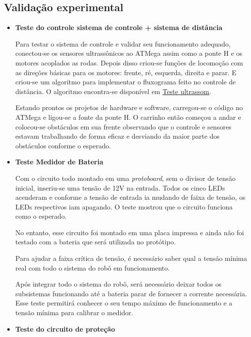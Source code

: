 \subsection{Validação experimental} %
	\label{sub:validação_experimental}
	\begin{itemize}
		\item \textbf{Teste do controle sistema de controle + sistema de distância}

			Para testar o sistema de controle e validar seu funcionamento adequado, conectou-se os sensores ultrassônicos ao ATMega assim como a ponte H e os motores acoplados as rodas. Depois disso criou-se funções de locomoção com as direções básicas para os motores: frente, ré, esquerda, direita e parar. E criou-se um algoritmo para implementar o fluxograma feito no controle de distância. O algoritmo encontra-se disponível em \href{https://github.com/kaiocoelho/CodigoESP/blob/master/codigo_teste/Teste_ultrassom.ino}{Teste ultrassom}.

			Estando prontos os projetos de hardware e software, carregou-se o código no ATMega e ligou-se a fonte da ponte H. O carrinho então começou a andar e colocou-se obstáculos em sua frente observando que o controle e sensores estavam trabalhando de forma eficaz e desviando da maior parte dos obstáculos conforme o esperado.

		\item \textbf{Teste Medidor de Bateria}

			Com o circuito todo montado em uma \textit{protoboard}, sem o divisor de tensão inicial, inseriu-se uma tensão de 12V na entrada. Todos os cinco LEDs acenderam e conforme a tensão de entrada ia mudando de faixa de tensão, os LEDs respectivos iam apagando. O teste mostrou que o circuito funciona como o esperado.

			No entanto, esse circuito foi montado em uma placa impressa e ainda não foi testado com a bateria que será utilizada no protótipo.

			Para ajudar a faixa crítica de tensão, é necessário saber qual a tensão mínima real com todo o sistema do robô em funcionamento.

			Após integrar todo o sistema do robô, será necessário deixar todos os subsistemas funcionando até a bateria parar de fornecer a corrente necessária. Esse teste permitirá conhecer o seu tempo máximo de funcionamento e a tensão mínima para calibrar o medidor.

		\item \textbf{Teste do circuito de proteção}


\end{itemize}
